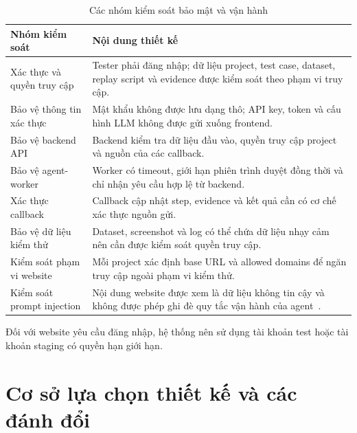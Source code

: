 \begin{table}[H]
\centering
\caption{Các nhóm kiểm soát bảo mật và vận hành}
\label{tab:chapter4_security_operation}
\renewcommand{\arraystretch}{1.2}
\begin{tabular}{|p{4.0cm}|p{10.2cm}|}
\hline
\textbf{Nhóm kiểm soát} &
\textbf{Nội dung thiết kế} \\
\hline

Xác thực và quyền truy cập &
Tester phải đăng nhập; dữ liệu project, test case, dataset, replay script và evidence được kiểm soát theo phạm vi truy cập. \\
\hline

Bảo vệ thông tin xác thực &
Mật khẩu không được lưu dạng thô; API key, token và cấu hình LLM không được gửi xuống frontend. \\
\hline

Bảo vệ backend API &
Backend kiểm tra dữ liệu đầu vào, quyền truy cập project và nguồn của các callback. \\
\hline

Bảo vệ agent-worker &
Worker có timeout, giới hạn phiên trình duyệt đồng thời và chỉ nhận yêu cầu hợp lệ từ backend. \\
\hline

Xác thực callback &
Callback cập nhật step, evidence và kết quả cần có cơ chế xác thực nguồn gửi. \\
\hline

Bảo vệ dữ liệu kiểm thử &
Dataset, screenshot và log có thể chứa dữ liệu nhạy cảm nên cần được kiểm soát quyền truy cập. \\
\hline

Kiểm soát phạm vi website &
Mỗi project xác định base URL và allowed domains để ngăn truy cập ngoài phạm vi kiểm thử. \\
\hline

Kiểm soát prompt injection &
Nội dung website được xem là dữ liệu không tin cậy và không được phép ghi đè quy tắc vận hành của agent~\cite{11359704}. \\
\hline
\end{tabular}
\end{table}

Đối với website yêu cầu đăng nhập, hệ thống nên sử dụng tài khoản test hoặc tài khoản staging có quyền hạn giới hạn.

\section{Cơ sở lựa chọn thiết kế và các đánh đổi}

